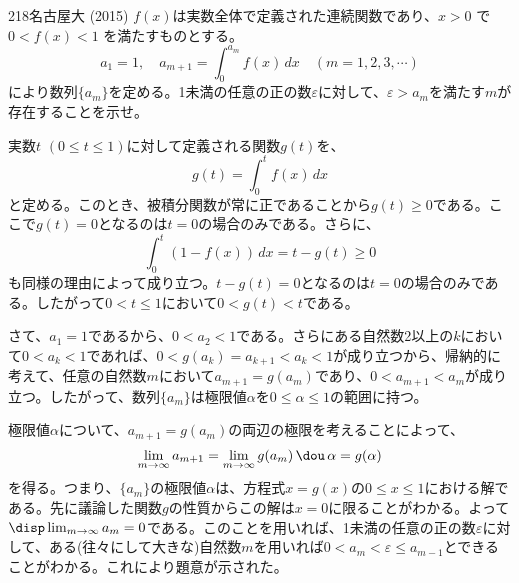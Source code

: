 \begin{thm}{218}{}{名古屋大 (2015)}
 $f(x)$は実数全体で定義された連続関数であり、$x>0$ で $0<f(x)<1$ を満たすものとする。
 \[ a_1=1,\quad a_{m+1}=\int_0^{a_m}\! f(x) \,dx \quad (m=1, 2, 3, \cdots) \]
 により数列$\{a_m\}$を定める。1未満の任意の正の数$\varepsilon$に対して、$\varepsilon>a_m$を満たす$m$が存在することを示せ。
\end{thm}

実数$t$ $(0\le t \le 1)$に対して定義される関数$g(t)$を、
\[ g(t) = \int_0^t\! f(x) \,dx \]
と定める。このとき、被積分関数が常に正であることから$g(t)\ge0$である。ここで$g(t)=0$となるのは$t=0$の場合のみである。さらに、
\[ \int_0^t\! \left(1-f(x)\right) \,dx = t-g(t) \ge0 \]
も同様の理由によって成り立つ。$t-g(t)=0$となるのは$t=0$の場合のみである。したがって$0 < t \le1$において$0<g(t)<t$である。

さて、$a_1=1$であるから、$0<a_2<1$である。さらにある自然数2以上の$k$において$0<a_k<1$であれば、$0<g(a_k)=a_{k+1}<a_k<1$が成り立つから、帰納的に考えて、任意の自然数$m$において$a_{m+1}=g(a_m)$であり、$0<a_{m+1}<a_m$が成り立つ。したがって、数列$\{a_m\}$は極限値$\alpha$を$0\le\alpha\le1$の範囲に持つ。

極限値$\alpha$について、$a_{m+1}=g(a_m)$の両辺の極限を考えることによって、
\[ \lim_{m\to\infty} a_{m+1}=\lim_{m\to\infty} g(a_m) \,\dou\, \alpha=g(\alpha) \]
を得る。つまり、$\{a_m\}$の極限値$\alpha$は、方程式$x=g(x)$の$0\le x\le 1$における解である。先に議論した関数$g$の性質からこの解は$x=0$に限ることがわかる。よって$\disp \lim_{m\to\infty} a_m=0$である。このことを用いれば、1未満の任意の正の数$\varepsilon$に対して、ある(往々にして大きな)自然数$m$を用いれば$0<a_m<\varepsilon\le a_{m-1}$とできることがわかる。これにより題意が示された。

